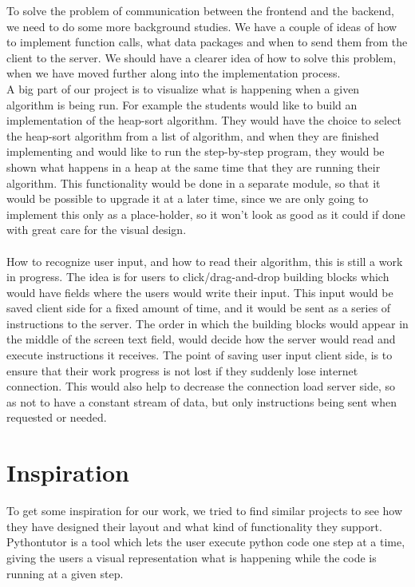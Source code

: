 \documentclass[11pt]{article}
\begin{document}
To solve the problem of communication between the frontend and the backend, we need to do some more background studies. We have a couple of ideas of how to implement function calls, what data packages and when to send them from the client to the server. We should have a clearer idea of how to solve this problem, when we have moved further along into the implementation process.\\
A big part of our project is to visualize what is happening when a given algorithm is being run. For example the students would like to build an implementation of the heap-sort algorithm. They would have the choice to select the heap-sort algorithm from a list of algorithm, and when they are finished implementing and would like to run the step-by-step program, they would be shown what happens in a heap at the same time that they are running their algorithm. This functionality would be done in a separate module, so that it would be possible to upgrade it at a later time, since we are only going to implement this only as a place-holder, so it won't look as good as it could if done with great care for the visual design.\\\\
How to recognize user input, and how to read their algorithm, this is still a work in progress. The idea is for users to click/drag-and-drop building blocks which would have fields where the users would write their input. This input would be saved client side for a fixed amount of time, and it would be sent as a series of instructions to the server. The order in which the building blocks would appear in the middle of the screen text field, would decide how the server would read and execute instructions it receives. The point of saving user input client side, is to ensure that their work progress is not lost if they suddenly lose internet connection. This would also help to decrease the connection load server side, so as not to have a constant stream of data, but only instructions being sent when requested or needed.
\section{Inspiration}
To get some inspiration for our work, we tried to find similar projects to see how they have designed their layout and what kind of functionality they support.\\
Pythontutor  \cite{pythontutor} is a tool which lets the user execute python code one step at a time, giving the users a visual representation what is happening while the code is running at a given step.\\
\end{document}

